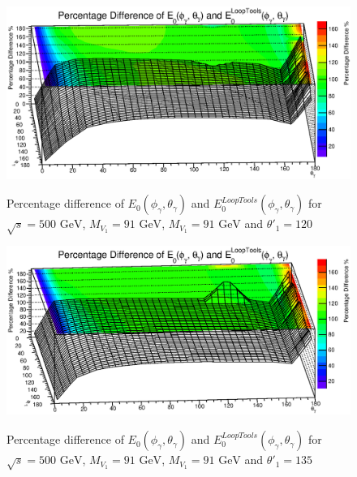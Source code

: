 \begin{figure}
	\begin{center}
		\includegraphics[scale=0.55]{120PD3.eps}\\
		\caption{ Percentage difference of $E_0(\phi_\gamma,\theta_\gamma)$ and $E_0^{LoopTools}(\phi_\gamma,\theta_\gamma)$ for $\sqrt{s}=500\text{ GeV}$, $M_{V_1}=91\text{ GeV}$, $M_{V_1}=91\text{ GeV}$ and $\theta'_1=120$ }
	\end{center}
\end{figure}


\begin{figure}
	\begin{center}
		\includegraphics[scale=0.55]{135PD3.eps}\\
		\caption{ Percentage difference of $E_0(\phi_\gamma,\theta_\gamma)$ and $E_0^{LoopTools}(\phi_\gamma,\theta_\gamma)$ for $\sqrt{s}=500\text{ GeV}$, $M_{V_1}=91\text{ GeV}$, $M_{V_1}=91\text{ GeV}$ and $\theta'_1=135$ }
	\end{center}
\end{figure}


